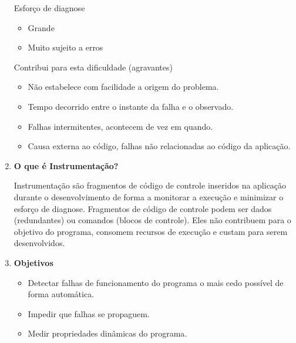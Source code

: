 \documentclass[
	12pt, %
]{fphw}
\begin{document}
\begin{doublespace}
\begin{enumerate}[label=\textbf{\arabic*})]
              Esforço de diagnose

              \begin{itemize}

                  \item Grande
                  \item Muito sujeito a erros

              \end{itemize}

              Contribui para esta dificuldade (agravantes)

              \begin{itemize}

                  \item Não estabelece com facilidade a origem do problema.
                  \item Tempo decorrido entre o instante da falha e o observado.
                  \item Falhas intermitentes, acontecem de vez em quando.
                  \item Causa externa ao código, falhas não relacionadas ao código da aplicação.

              \end{itemize}

        \item \textbf{O que é Instrumentação?}

              Instrumentação são fragmentos de código de controle inseridos na aplicação durante o desenvolvimento de forma a monitorar a execução e minimizar o esforço de diagnose. Fragmentos de código de controle podem ser dados (redundantes) ou comandos (blocos de controle). Eles não contribuem para o objetivo do programa, consomem recursos de execução e custam para serem desenvolvidos.

        \item \textbf{Objetivos}

              \begin{itemize}

                  \item Detectar falhas de funcionamento do programa o mais cedo possível de forma automática.
                  \item Impedir que falhas se propaguem.
                  \item Medir propriedades dinâmicas do programa.

              \end{itemize}


\end{enumerate}
\end{doublespace}
\end{document}
